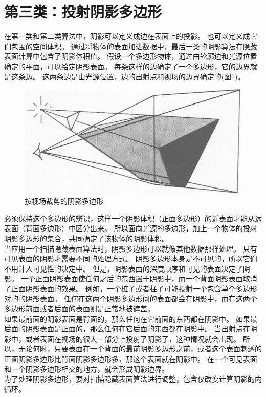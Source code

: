 \section{第三类：投射阴影多边形}
在第一类和第二类算法中，阴影可以定义成边在表面上的投影。
也可以定义成它们包围的空间体积。
通过将物体的表面加进数据中，最后一类的阴影算法在隐藏表面计算中包含了阴影体积值。
假设一个多边形物体，通过由轮廓边和光源位置确定的平面，可以给定阴影表面。
每条这样的边确定了一个多边形，它的边界就是这条边。
这两条边是由光源位置，边的出射点和视场的边界确定的(图\ref{fig:fig4})。
\begin{figure}[h]
\centering
\includegraphics[width=0.9\linewidth]{fig4}
\caption[fig4]{按视场裁剪的阴影多边形}
\label{fig:fig4}
\end{figure}
必须保持这个多边形的辨识，这样一个阴影体积（正面多边形）的近表面才能从远表面（背面多边形）中区分出来。
所以面向光源的多边形，加上一个物体的投射阴影多边形的集合，共同确定了该物体的阴影体积。\\
当应用一个扫描隐藏表面算法时，阴影多边形可以就像其他数据那样处理。
只有可见表面的阴影才需要不同的处理方式。
阴影多边形本身是不可见的，所以它们不用计入可见性的决定中。
但是，阴影表面的深度顺序和可见的表面决定了阴影。
一个正面阴影表面使任何之后的东西置于阴影中，而一个背面阴影表面取消了正面阴影表面的效果。
例如，一个桩子或者柱子可能投射一个包含单个多边形对的的阴影表面。
任何在这两个阴影多边形间的表面都会在阴影中，而在这两个多边形前面或者后面的表面则是正常地被遮盖。\\
如果最前面的阴影表面是背面的，那么任何在它前面的东西都在阴影中。
如果最后面的阴影表面是正面的，那么任何在它后面的东西都在阴影中。
当出射点在阴影中，或者表面在视场的很大一部分上投射了阴影了，这种情况就会出现。
所以，无论何时，只要表面在一个背面的最前阴影多边形之前，或者这个表面刺透的正面阴影多边形比背面阴影多边形多，那这个表面就在阴影中。
在一个可见表面和一个阴影多边形相交的地方，就会形成阴影边界。\\
为了处理阴影多边形，要对扫描隐藏表面算法进行调整，包含仅改变计算阴影的内循环。
